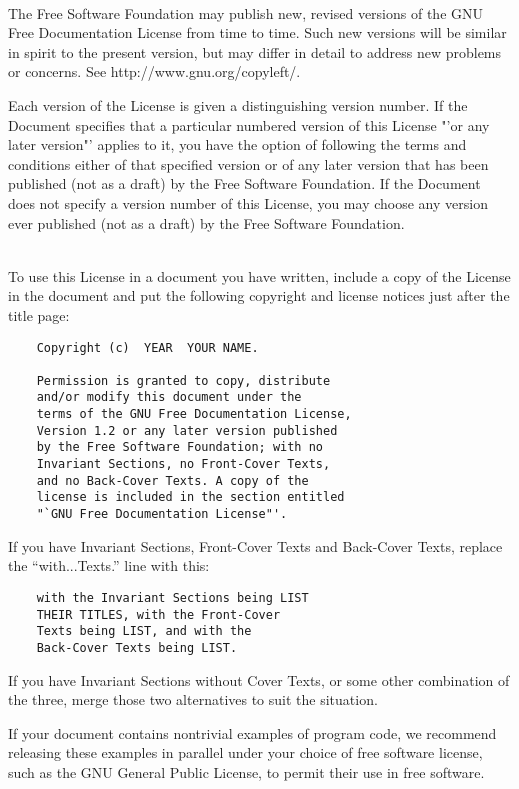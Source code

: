 \bigskip{}\\

\noindent
The Free Software Foundation may publish new, revised versions of the GNU Free Documentation License from time to time.  Such new versions will be similar in spirit to the present version, but may differ in detail to address new problems or concerns.  See http://www.gnu.org/copyleft/.

Each version of the License is given a distinguishing version number. If the Document specifies that a particular numbered version of this License "'or any later version"' applies to it, you have the option of following the terms and conditions either of that specified version or of any later version that has been published (not as a draft) by the Free Software Foundation.  If the Document does not specify a version number of this License, you may choose any version ever published (not as a draft) by the Free Software Foundation.


\bigskip{}\\

\noindent
To use this License in a document you have written, include a copy of the License in the document and put the following copyright and license notices just after the title page:

\begin{verbatim}
    Copyright (c)  YEAR  YOUR NAME.
    
    Permission is granted to copy, distribute 
    and/or modify this document under the 
    terms of the GNU Free Documentation License,
    Version 1.2 or any later version published 
    by the Free Software Foundation; with no 
    Invariant Sections, no Front-Cover Texts, 
    and no Back-Cover Texts. A copy of the 
    license is included in the section entitled 
    "`GNU Free Documentation License"'.
\end{verbatim}
If you have Invariant Sections, Front-Cover Texts and Back-Cover Texts, replace the "`with...Texts."' line with this:


\begin{verbatim}
    with the Invariant Sections being LIST 
    THEIR TITLES, with the Front-Cover 
    Texts being LIST, and with the 
    Back-Cover Texts being LIST.
\end{verbatim}
If you have Invariant Sections without Cover Texts, or some other combination of the three, merge those two alternatives to suit the situation.

If your document contains nontrivial examples of program code, we
recommend releasing these examples in parallel under your choice of
free software license, such as the GNU General Public License,
to permit their use in free software.


